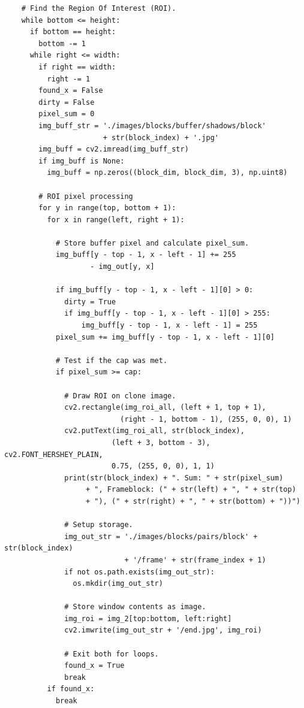 \documentclass[conference]{IEEEtran}
\begin{document}
{\begin{verbatim}
    # Find the Region Of Interest (ROI).
    while bottom <= height:
      if bottom == height:
        bottom -= 1
      while right <= width:
        if right == width:
          right -= 1
        found_x = False
        dirty = False
        pixel_sum = 0
        img_buff_str = './images/blocks/buffer/shadows/block'
                       + str(block_index) + '.jpg'
        img_buff = cv2.imread(img_buff_str)
        if img_buff is None:
          img_buff = np.zeros((block_dim, block_dim, 3), np.uint8)
        
        # ROI pixel processing
        for y in range(top, bottom + 1):
          for x in range(left, right + 1):

            # Store buffer pixel and calculate pixel_sum.
            img_buff[y - top - 1, x - left - 1] += 255
                    - img_out[y, x]

            if img_buff[y - top - 1, x - left - 1][0] > 0:
              dirty = True
              if img_buff[y - top - 1, x - left - 1][0] > 255:
                  img_buff[y - top - 1, x - left - 1] = 255
            pixel_sum += img_buff[y - top - 1, x - left - 1][0]
            
            # Test if the cap was met.
            if pixel_sum >= cap:

              # Draw ROI on clone image.
              cv2.rectangle(img_roi_all, (left + 1, top + 1),
                           (right - 1, bottom - 1), (255, 0, 0), 1)
              cv2.putText(img_roi_all, str(block_index),
                         (left + 3, bottom - 3), cv2.FONT_HERSHEY_PLAIN,
                         0.75, (255, 0, 0), 1, 1)
              print(str(block_index) + ". Sum: " + str(pixel_sum)
                   + ", Frameblock: (" + str(left) + ", " + str(top)
                   + "), (" + str(right) + ", " + str(bottom) + "))")
              
              # Setup storage.
              img_out_str = './images/blocks/pairs/block' + str(block_index)
                            + '/frame' + str(frame_index + 1)
              if not os.path.exists(img_out_str):
                os.mkdir(img_out_str)

              # Store window contents as image.
              img_roi = img_2[top:bottom, left:right]
              cv2.imwrite(img_out_str + '/end.jpg', img_roi)
              
              # Exit both for loops.
              found_x = True
              break
          if found_x:
            break


\end{verbatim}}
\end{document}
